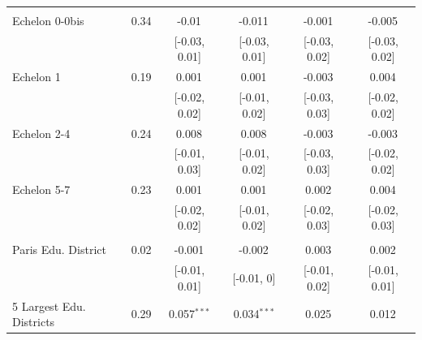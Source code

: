 \begin{table}[!htp]
{{\begin{threeparttable}
\begin{tabular}[t]{lccccc}
\addlinespace[0.3em]
\multicolumn{6}{l}{\textit{Need-Based Grants}}\\
\hspace{1em}\hspace{1em}Echelon 0-0bis & 0.34 & -0.01$^{}$ & -0.011$^{}$ & -0.001$^{}$ & -0.005$^{}$\\
\hspace{1em}\hspace{1em} &  & {}[-0.03, 0.01] & {}[-0.03, 0.01] & {}[-0.03, 0.02] & {}[-0.03, 0.02]\\
\hspace{1em}\hspace{1em}Echelon 1 & 0.19 & 0.001$^{}$ & 0.001$^{}$ & -0.003$^{}$ & 0.004$^{}$\\
\hspace{1em}\hspace{1em} &  & {}[-0.02, 0.02] & {}[-0.01, 0.02] & {}[-0.03, 0.03] & {}[-0.02, 0.02]\\
\hspace{1em}\hspace{1em}Echelon 2-4 & 0.24 & 0.008$^{}$ & 0.008$^{}$ & -0.003$^{}$ & -0.003$^{}$\\
\hspace{1em}\hspace{1em} &  & {}[-0.01, 0.03] & {}[-0.01, 0.02] & {}[-0.03, 0.03] & {}[-0.02, 0.02]\\
\hspace{1em}\hspace{1em}Echelon 5-7 & 0.23 & 0.001$^{}$ & 0.001$^{}$ & 0.002$^{}$ & 0.004$^{}$\\
\hspace{1em}\hspace{1em} &  & {}[-0.02, 0.02] & {}[-0.01, 0.02] & {}[-0.02, 0.03] & {}[-0.02, 0.03]\\
\addlinespace[0.3em]
\multicolumn{6}{l}{\textit{Geographic}}\\
\hspace{1em}\hspace{1em}Paris Edu. District & 0.02 & -0.001$^{}$ & -0.002$^{}$ & 0.003$^{}$ & 0.002$^{}$\\
\hspace{1em}\hspace{1em} &  & {}[-0.01, 0.01] & {}[-0.01, 0] & {}[-0.01, 0.02] & {}[-0.01, 0.01]\\
\hspace{1em}\hspace{1em}5 Largest Edu. Districts & 0.29 & 0.057$^{***}$ & 0.034$^{***}$ & 0.025$^{}$ & 0.012$^{}$\\

\end{tabular}
\end{threeparttable}}}
\end{table}

